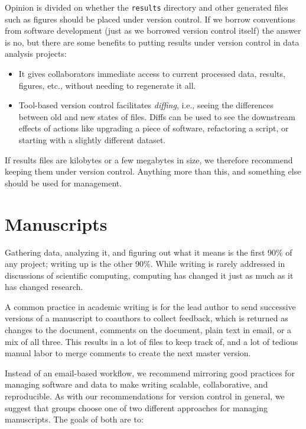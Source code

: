 \documentclass[10pt]{article}
\begin{document}
Opinion is divided on whether the \texttt{results} directory and other
generated files such as figures should be placed under version
control. If we borrow conventions from software development (just as
we borrowed version control itself) the answer is no, but there are
some benefits to putting results under version control in data
analysis projects:

\begin{itemize}

\item
  It gives collaborators immediate access to current processed data,
  results, figures, etc., without needing to regenerate it all.

\item
  Tool-based version control facilitates \emph{diffing}, i.e., seeing the
  differences between old and new states of files. Diffs can be used
  to see the downstream effects of actions like upgrading a piece of
  software, refactoring a script, or starting with a slightly
  different dataset.

\end{itemize}

If results files are kilobytes or a few megabytes in size, we
therefore recommend keeping them under version control. Anything more
than this, and something else should be used for management.

\section{Manuscripts}\label{sec:manuscripts}

Gathering data, analyzing it, and figuring out what it means is the
first 90\% of any project; writing up is the other 90\%. While writing
is rarely addressed in discussions of scientific computing, computing
has changed it just as much as it has changed research.

A common practice in academic writing is for the lead author to send
successive versions of a manuscript to coauthors to collect feedback,
which is returned as changes to the document, comments on the
document, plain text in email, or a mix of all three. This results in
a lot of files to keep track of, and a lot of tedious manual labor to
merge comments to create the next master version.

Instead of an email-based workflow, we recommend mirroring good
practices for managing software and data to make writing scalable,
collaborative, and reproducible.  As with our recommendations for
version control in general, we suggest that groups choose one of two
different approaches for managing manuscripts.  The goals of both are
to:
\end{document}
